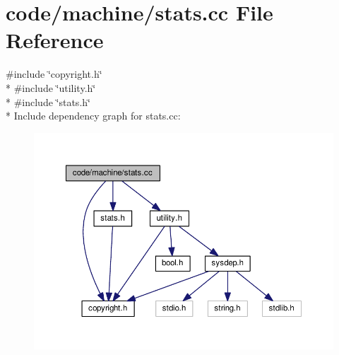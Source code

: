 \section{code/machine/stats.cc File Reference}
\label{stats_8cc}
{\ttfamily \#include \char`\"{}copyright.\+h\char`\"{}}\\*
{\ttfamily \#include \char`\"{}utility.\+h\char`\"{}}\\*
{\ttfamily \#include \char`\"{}stats.\+h\char`\"{}}\\*
Include dependency graph for stats.\+cc\+:
\nopagebreak
\begin{figure}[H]
\begin{center}
\leavevmode
\includegraphics[width=350pt]{stats_8cc__incl}
\end{center}
\end{figure}

